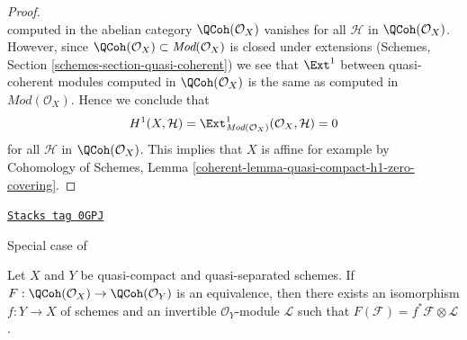 \begin{proof}
$$$$
computed in the abelian category $\QCoh(\mathcal{O}_X)$ vanishes for all
$\mathcal{H}$ in $\QCoh(\mathcal{O}_X)$. However, since
$\QCoh(\mathcal{O}_X) \subset \textit{Mod}(\mathcal{O}_X)$
is closed under extensions
(Schemes, Section \ref{schemes-section-quasi-coherent})
we see that $\Ext^1$ between quasi-coherent modules
computed in $\QCoh(\mathcal{O}_X)$ is the same as computed
in $\textit{Mod}(\mathcal{O}_X)$. Hence we conclude that
$$
H^1(X, \mathcal{H}) =
\Ext^1_{\textit{Mod}(\mathcal{O}_X)}(\mathcal{O}_X, \mathcal{H}) = 0
$$
for all $\mathcal{H}$ in $\QCoh(\mathcal{O}_X)$.
This implies that $X$ is affine for example by
Cohomology of Schemes, Lemma
\ref{coherent-lemma-quasi-compact-h1-zero-covering}.
\end{proof}

\begin{proposition}
\label{functors-proposition-gabriel-rosenberg}
\href{https://stacks.math.columbia.edu/tag/0GPJ}{\texttt{Stacks tag 0GPJ}}

\begin{reference}
Special case of \cite[Theorem 1.2]{Brandenburg}
\end{reference}
Let $X$ and $Y$ be quasi-compact and quasi-separated schemes.
If $F : \QCoh(\mathcal{O}_X) \to \QCoh(\mathcal{O}_Y)$
is an equivalence, then there exists an isomorphism
$f : Y \to X$ of schemes and an invertible $\mathcal{O}_Y$-module
$\mathcal{L}$ such that $F(\mathcal{F}) = f^*\mathcal{F} \otimes \mathcal{L}$.
\end{proposition}

